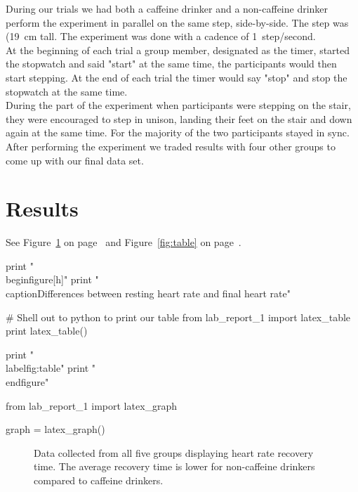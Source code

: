 \documentclass{article}
\begin{document}
During our trials we had both a caffeine drinker and a non-caffeine drinker perform the experiment
in parallel on the same step, side-by-side. The step was (\SI{19}{cm} tall. The experiment was done
with a cadence of \SI{1}{step/second}. \\

At the beginning of each trial a group member, designated as the timer, started the stopwatch and
said "start" at the same time, the participants would then start stepping. At the end of each trial
the timer would say "stop" and stop the stopwatch at the same time. \\

During the part of the experiment when participants were stepping on the stair, they were encouraged
to step in unison, landing their feet on the stair and down again at the same time. For the majority
of the two participants stayed in sync. \\

After performing the experiment we traded results with four other groups to come up with our final
data set. \\

\section{Results}
See Figure~\ref{fig:graph} on page~\pageref{fig:graph} and Figure~\ref{fig:table} on page~\pageref{fig:table}.

\begin{python}
print "\\begin{figure}[h]"
print "\\caption{Differences between resting heart rate and final heart rate}"

# Shell out to python to print our table
from lab_report_1 import latex_table
print latex_table()

print "\\label{fig:table}"
print "\\end{figure}"
\end{python}

\begin{sympysilent}
from lab_report_1 import latex_graph

graph = latex_graph()
\end{sympysilent}
\begin{figure}[h]
    \caption{Data collected from all five groups displaying heart rate recovery time. The average
    recovery time is lower for non-caffeine drinkers compared to caffeine drinkers.}
    \label{fig:graph}
\end{figure}
\end{document}
